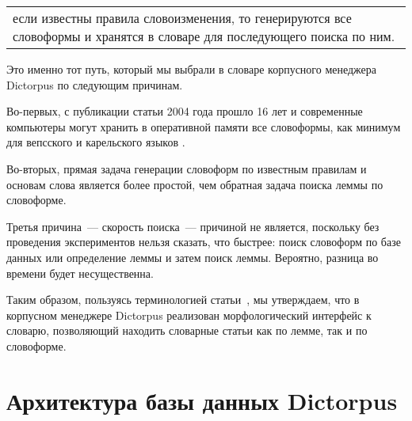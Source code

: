 \begin{tabular}{|p{15cm}}
если известны правила словоизменения, то генерируются все словоформы и хранятся в словаре для последующего поиска по ним. 
\end{tabular}

\noindent
Это именно тот путь, который мы выбрали в словаре корпусного менеджера Dictorpus 
по следующим причинам. 

Во-первых, с публикации статьи 2004 года прошло 16 лет и современные компьютеры могут хранить в оперативной памяти все словоформы, как минимум для вепсского и карельского языков .

Во-вторых, прямая задача генерации словоформ по известным правилам и основам слова является более простой, чем обратная задача поиска леммы по словоформе.

Третья причина~--- скорость поиска~--- причиной не является, 
поскольку без проведения экспериментов нельзя сказать, что быстрее: 
поиск словоформ по базе данных или определение леммы и затем поиск леммы. 
Вероятно, разница во времени будет несущественна.

Таким образом, пользуясь терминологией статьи~\cite{morphoAPI2dict2004Maxwell}, 
мы утверждаем, что в корпусном менеджере Dictorpus 
реализован морфологический интерфейс к словарю, 
позволяющий находить словарные статьи как по лемме, так и по словоформе.




\section{Архитектура базы данных Dictorpus} \label{sect_arch_db}

